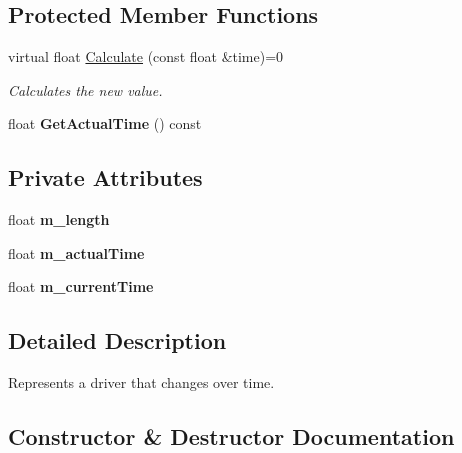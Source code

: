 \subsection*{Protected Member Functions}
\begin{DoxyCompactItemize}
\item 
virtual float \hyperlink{class_flounder_1_1_i_driver_a969f0c8da089f9d17129ee12b40c354a}{Calculate} (const float \&time)=0
\begin{DoxyCompactList}\small\item\em Calculates the new value. \end{DoxyCompactList}\item 
\mbox{\label{class_flounder_1_1_i_driver_ab60bf6000d9037d48e953abffcd3ece4}} 
float {\bfseries Get\+Actual\+Time} () const
\end{DoxyCompactItemize}
\subsection*{Private Attributes}
\begin{DoxyCompactItemize}
\item 
\mbox{\label{class_flounder_1_1_i_driver_a4afccec0b87b29784e3802948a19ee98}} 
float {\bfseries m\+\_\+length}
\item 
\mbox{\label{class_flounder_1_1_i_driver_a94988767725167382aa1d7999f148db5}} 
float {\bfseries m\+\_\+actual\+Time}
\item 
\mbox{\label{class_flounder_1_1_i_driver_a9d4f975c3f2b2d20db66d9c486b3b7bf}} 
float {\bfseries m\+\_\+current\+Time}
\end{DoxyCompactItemize}


\subsection{Detailed Description}
Represents a driver that changes over time. 



\subsection{Constructor \& Destructor Documentation}
\mbox{\label{class_flounder_1_1_i_driver_a76d7165848c3b263f50048014e03818a}} 
